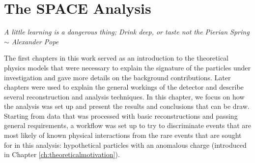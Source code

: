 \chapter{The SPACE Analysis}
\label{ch:space}
\begin{flushright}
\textit{A little learning is a dangerous thing; Drink deep, or taste not the Pierian Spring \\$\sim$ Alexander Pope}
\end{flushright}

\noindent The first chapters in this work served as an introduction to the theoretical physics models that were necessary to explain the signature of the particles under investigation and gave more details on the background contributions. Later chapters were used to explain the general workings of the detector and describe several reconstruction and analysis techniques. In this chapter, we focus on how the analysis was set up and present the results and conclusions that can be draw. Starting from data that was processed with basic reconstructions and passing general requirements, a workflow was set up to try to discriminate events that are most likely of known physical interactions from the rare events that are sought for in this analysis: hypothetical particles with an anomalous charge (introduced in Chapter \ref{ch:theoreticalmotivation}). 

